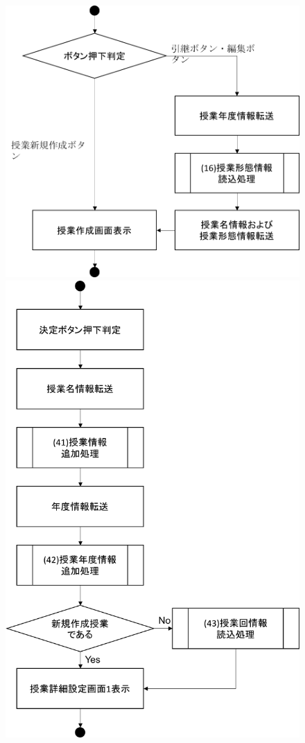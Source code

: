 \begin{figure}[htbp]
 \begin{minipage}{0.5\hsize}
  \begin{center}
   \includegraphics[width=0.9\linewidth,clip]{./img/flow/39.png}
  \end{center}
 \end{minipage}
 \begin{minipage}{0.5\hsize}
  \begin{center}
   \includegraphics[width=0.85\linewidth,clip]{./img/flow/40.png}

\end{center}
\end{minipage}
\end{figure}
